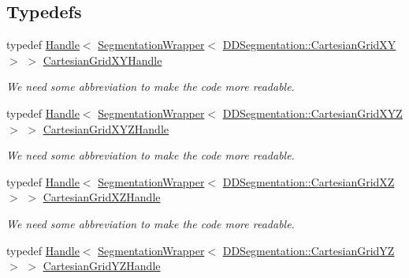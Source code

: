 \subsection*{Typedefs}
\begin{DoxyCompactItemize}
\item 
typedef \hyperlink{class_d_d4hep_1_1_handle}{Handle}$<$ \hyperlink{class_d_d4hep_1_1_geometry_1_1_segmentation_wrapper}{SegmentationWrapper}$<$ \hyperlink{class_d_d4hep_1_1_d_d_segmentation_1_1_cartesian_grid_x_y}{DDSegmentation::CartesianGridXY} $>$ $>$ \hyperlink{namespace_d_d4hep_1_1_geometry_a3d6ee3d4ad1e20c15b726ca41f8f3b59}{CartesianGridXYHandle}
\begin{DoxyCompactList}\small\item\em We need some abbreviation to make the code more readable. \item\end{DoxyCompactList}\item 
typedef \hyperlink{class_d_d4hep_1_1_handle}{Handle}$<$ \hyperlink{class_d_d4hep_1_1_geometry_1_1_segmentation_wrapper}{SegmentationWrapper}$<$ \hyperlink{class_d_d4hep_1_1_d_d_segmentation_1_1_cartesian_grid_x_y_z}{DDSegmentation::CartesianGridXYZ} $>$ $>$ \hyperlink{namespace_d_d4hep_1_1_geometry_ae299410d519f2026e72fd36ea6967324}{CartesianGridXYZHandle}
\begin{DoxyCompactList}\small\item\em We need some abbreviation to make the code more readable. \item\end{DoxyCompactList}\item 
typedef \hyperlink{class_d_d4hep_1_1_handle}{Handle}$<$ \hyperlink{class_d_d4hep_1_1_geometry_1_1_segmentation_wrapper}{SegmentationWrapper}$<$ \hyperlink{class_d_d4hep_1_1_d_d_segmentation_1_1_cartesian_grid_x_z}{DDSegmentation::CartesianGridXZ} $>$ $>$ \hyperlink{namespace_d_d4hep_1_1_geometry_a3ae1751ca0d9c7d138f97af6c2caedbc}{CartesianGridXZHandle}
\begin{DoxyCompactList}\small\item\em We need some abbreviation to make the code more readable. \item\end{DoxyCompactList}\item 
typedef \hyperlink{class_d_d4hep_1_1_handle}{Handle}$<$ \hyperlink{class_d_d4hep_1_1_geometry_1_1_segmentation_wrapper}{SegmentationWrapper}$<$ \hyperlink{class_d_d4hep_1_1_d_d_segmentation_1_1_cartesian_grid_y_z}{DDSegmentation::CartesianGridYZ} $>$ $>$ \hyperlink{namespace_d_d4hep_1_1_geometry_afd3542602caa1ff9674c251a7747b0f6}{CartesianGridYZHandle}

\end{DoxyCompactItemize}
